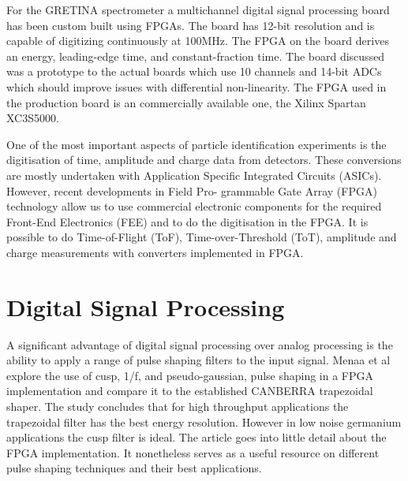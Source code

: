 \documentclass[12pt]{article}
\begin{document}
{\large\textbf{\cite{Cromaz}}}

For the GRETINA spectrometer a multichannel digital signal processing board has been custom built using FPGAs. The board has 12-bit resolution and is capable of digitizing continuously at 100MHz. The FPGA on the board derives an energy, leading-edge time, and constant-fraction time. The board discussed was a prototype to the actual boards which use 10 channels and 14-bit ADCs which should improve issues with differential non-linearity. The FPGA used in the production board is an commercially available one, the Xilinx Spartan XC3S5000.
\\[20pt]


{\large\textbf{\cite{Ugur}}}

One of the most important aspects of particle identification experiments is the digitisation of time, amplitude and charge data from detectors. These conversions are mostly undertaken with Application Specific Integrated Circuits (ASICs). However, recent developments in Field Pro- grammable Gate Array (FPGA) technology allow us to use commercial electronic components for the required Front-End Electronics (FEE) and to do the digitisation in the FPGA. It is possible to do Time-of-Flight (ToF), Time-over-Threshold (ToT), amplitude and charge measurements with converters implemented in FPGA. 
\\[20pt]


\section{Digital Signal Processing}   %


{\large\textbf{\cite{Menaa2011512}}}

A significant advantage of digital signal processing over analog processing is the ability to apply a range of pulse shaping filters to the input signal. Menaa et al explore the use of cusp, 1/f, and pseudo-gaussian, pulse shaping in a FPGA implementation and compare it to the established CANBERRA trapezoidal shaper. The study concludes that for high throughput applications the trapezoidal filter has the best energy resolution. However in low noise germanium applications the cusp filter is ideal.
The article goes into little detail about the FPGA implementation. It nonetheless serves as a useful resource on different pulse shaping techniques and their best applications.
\\[20pt]
\end{document}
